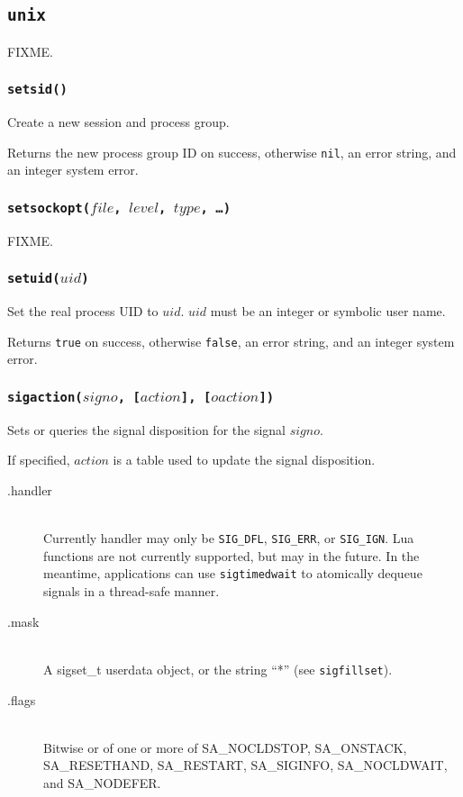\documentclass[11pt, oneside]{memoir}
\newcommand*{\true}[0]{\texttt{true}\xspace}
\newcommand*{\false}[0]{\texttt{false}\xspace}
\newcommand*{\nil}[0]{\texttt{nil}\xspace}
\newcommand*{\fn}[1]{\texttt{#1}\xspace}
\newcounter{toccols}
\newenvironment{Module}[1]{
	\subsection{\texttt{#1}}
	\addtocontents{toc}{
		\protect\begin{multicols}{\value{toccols}}
	}
}{
	\addtocontents{toc}{\protect\end{multicols}}
}
\begin{document}
\begin{Module}{unix}
FIXME.

\subsubsection[\fn{setsid}]{\fn{setsid()}}

Create a new session and process group.

Returns the new process group ID on success, otherwise \nil, an error string, and an integer system error.

\subsubsection[\fn{setsockopt}]{\fn{setsockopt($file$, $level$, $type$, \ldots)}}

FIXME.

\subsubsection[\fn{setuid}]{\fn{setuid($uid$)}}

Set the real process UID to $uid$. $uid$ must be an integer or symbolic user name.

Returns \true on success, otherwise \false, an error string, and an integer system error.

\subsubsection[\fn{sigaction}]{\fn{sigaction($signo$, [$action$], [$oaction$])}}

Sets or queries the signal disposition for the signal $signo$.

If specified, $action$ is a table used to update the signal disposition.

\begin{description}
\item[.handler] \hfill \\
Currently handler may only be \texttt{SIG\_DFL}, \texttt{SIG\_ERR}, or \texttt{SIG\_IGN}.
Lua functions are not currently supported, but may in the future. In the meantime, applications can use \fn{sigtimedwait} to atomically dequeue signals in a thread-safe manner.
\item[.mask] \hfill \\
A sigset\_t userdata object, or the string ``*'' (see \fn{sigfillset}).
\item[.flags] \hfill \\
Bitwise or of one or more of SA\_NOCLDSTOP, SA\_ONSTACK, SA\_RESETHAND, SA\_RESTART, SA\_SIGINFO, SA\_NOCLDWAIT, and SA\_NODEFER.
\end{description}


\end{Module}
\end{document}
